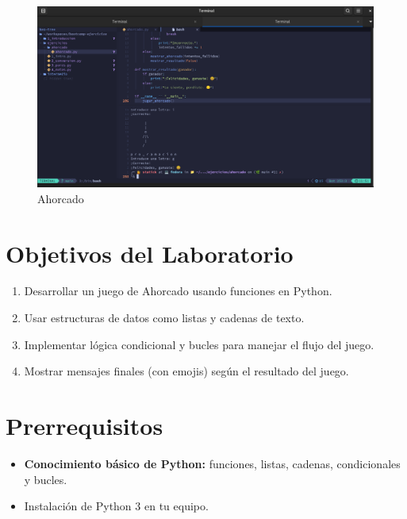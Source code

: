 \documentclass[
  a4paper,
  DIV=11,
  numbers=noendperiod,
  onepage,
  openany]{scrreprt}
\providecommand{\tightlist}{%
  \setlength{\itemsep}{0pt}\setlength{\parskip}{0pt}}\usepackage{longtable,booktabs,array}
\begin{document}
\begin{figure}[H]

{\centering \includegraphics{unidades/Proyectos/images/ahorcado.png}

}

\caption{Ahorcado}

\end{figure}%

\section{Objetivos del Laboratorio}\label{objetivos-del-laboratorio}

\begin{enumerate}
\def\labelenumi{\arabic{enumi}.}
\tightlist
\item
  Desarrollar un juego de Ahorcado usando funciones en Python.
\item
  Usar estructuras de datos como listas y cadenas de texto.
\item
  Implementar lógica condicional y bucles para manejar el flujo del
  juego.
\item
  Mostrar mensajes finales (con emojis) según el resultado del juego.
\end{enumerate}

\section{Prerrequisitos}\label{prerrequisitos}

\begin{itemize}
\item
  \textbf{Conocimiento básico de Python:} funciones, listas, cadenas,
  condicionales y bucles.
\item
  Instalación de Python 3 en tu equipo.
\end{itemize}
\end{document}
